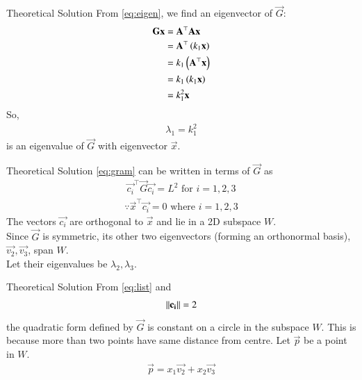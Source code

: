 \documentclass{beamer}
\begin{document}
\begin{frame}{Theoretical Solution}
From \eqref{eq:eigen}, we find an eigenvector of $\vec{G}$:
\begin{align}
    \mathbf{G}\mathbf{x} &= \mathbf{A}^\top\mathbf{A}\mathbf{x} \\
    &= \mathbf{A}^\top\left(k_1\mathbf{x}\right) \\
    &= k_1\left(\mathbf{A}^\top\mathbf{x}\right) \\
    &= k_1\left(k_1\mathbf{x}\right) \\
    &= k_1^2\mathbf{x}
\end{align}
So, 
\begin{align}
	\lambda_1 = k_1^2
\end{align} is an eigenvalue of $\vec{G}$ with eigenvector $\vec{x}$.
\end{frame}

\begin{frame}{Theoretical Solution}
\eqref{eq:gram} can be written in terms of $\vec{G}$ as
\begin{align}
    \vec{c_i}^\top \vec{G} \vec{c_i} = L^2 \text{ for } i=1,2,3 \label{eq:list}
\end{align}
\begin{align}
	\because \vec{x}^\top\vec{c_i}=0\text{ where }i = 1, 2, 3
\end{align}
The vectors $\vec{c_i}$ are orthogonal to $\vec{x}$ and lie in a 2D subspace $W$. \\
Since $\vec{G}$ is symmetric, its other two eigenvectors (forming an orthonormal basis), $\vec{v_2}, \vec{v_3}$, span $W$. \\
Let their eigenvalues be $\lambda_2, \lambda_3$.
\end{frame}

\begin{frame}{Theoretical Solution}
From \eqref{eq:list} and
\begin{align}
	\left\lVert\mathbf{c_i}\right\rVert = 2
\end{align}
the quadratic form defined by $\vec{G}$ is constant on a circle in the subspace $W$. This is because more than two points have same distance from centre. Let $\vec{p}$ be a point in $W$.
\begin{align}
	\vec{p} = x_1\vec{v_2}+x_2\vec{v_3} \label{eq:99}
\end{align}
\end{frame}
\end{document}
